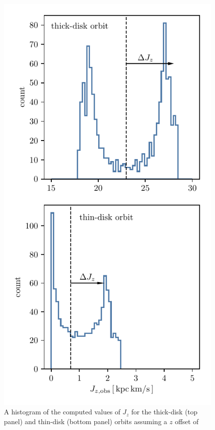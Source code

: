 \documentclass[twocolumn]{aastex62}
\begin{document}
\begin{figure}
\begin{center}
\includegraphics[width=\columnwidth]{fig/schmactions_Jz_zerr_hist.pdf}
\end{center}
\caption{A histogram of the computed values of $J_z$ for the thick-disk (top
panel) and thin-disk (bottom panel) orbits assuming a $z$ offset of
}
\end{figure}
\end{document}
